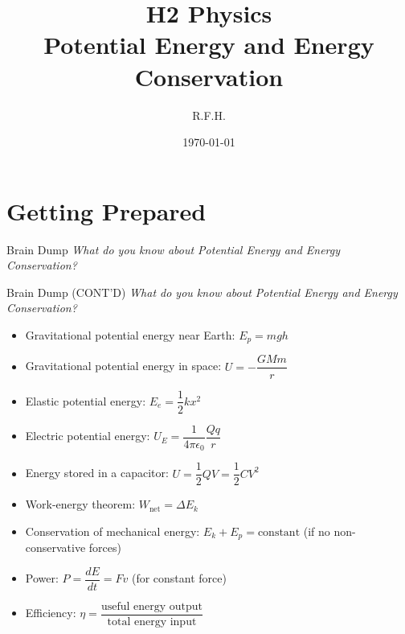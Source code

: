 \documentclass[11pt]{beamer}
\title{H2 Physics \\ Potential Energy and Energy Conservation}
\author{R.F.H.}
\date{\today}
\begin{document}
\begin{frame}
\titlepage
\end{frame}

\section{Getting Prepared}

\begin{frame}[shrink=15]{Brain Dump}
\centering
\Large
\textit{What do you know about Potential Energy and Energy Conservation?}
\vfill
\end{frame}

\begin{frame}[shrink=15]{Brain Dump (CONT'D)}
\centering
\Large
\textit{What do you know about Potential Energy and Energy Conservation?}
\vfill
\begin{itemize}
    \item Gravitational potential energy near Earth: $E_p = mgh$
    \item Gravitational potential energy in space: $U = -\dfrac{GMm}{r}$
    \item Elastic potential energy: $E_e = \dfrac12 kx^2$
    \item Electric potential energy: $U_E = \dfrac{1}{4\pi\epsilon_0}\dfrac{Qq}{r}$
    \item Energy stored in a capacitor: $U = \dfrac12 QV = \dfrac12 CV^2$
    \item Work-energy theorem: $W_{\text{net}} = \Delta E_k$
    \item Conservation of mechanical energy: $E_k + E_p = \text{constant}$ (if no non-conservative forces)
    \item Power: $P = \dfrac{dE}{dt} = Fv$ (for constant force)
    \item Efficiency: $\eta = \dfrac{\text{useful energy output}}{\text{total energy input}}$
\end{itemize}
\end{frame}
\end{document}
